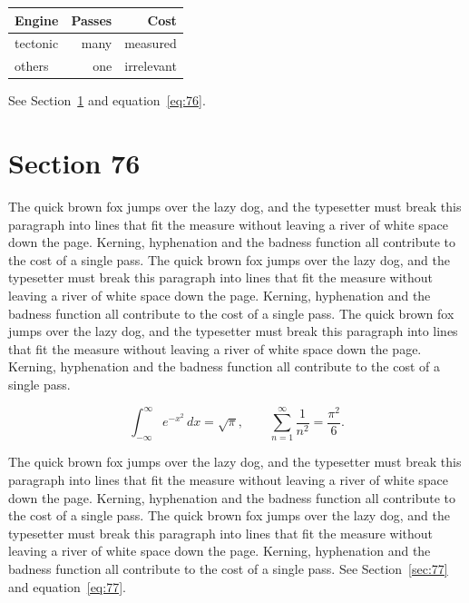 \documentclass{article}
\begin{document}
\begin{center}
\begin{tabular}{lrr}
\toprule
Engine & Passes & Cost \\
\midrule
tectonic & many & measured \\
others & one & irrelevant \\
\bottomrule
\end{tabular}
\end{center}

See Section~\ref{sec:76} and equation~\eqref{eq:76}.
\section{Section 76}
\label{sec:76}
The quick brown fox jumps over the lazy dog, and the typesetter must break this paragraph into lines that fit the measure without leaving a river of white space down the page. Kerning, hyphenation and the badness function all contribute to the cost of a single pass. The quick brown fox jumps over the lazy dog, and the typesetter must break this paragraph into lines that fit the measure without leaving a river of white space down the page. Kerning, hyphenation and the badness function all contribute to the cost of a single pass. The quick brown fox jumps over the lazy dog, and the typesetter must break this paragraph into lines that fit the measure without leaving a river of white space down the page. Kerning, hyphenation and the badness function all contribute to the cost of a single pass. 

\begin{equation}\label{eq:76}
\int_{-\infty}^{\infty} e^{-x^{2}}\,dx = \sqrt{\pi}, \qquad
\sum_{n=1}^{\infty} \frac{1}{n^{2}} = \frac{\pi^{2}}{6}.
\end{equation}

The quick brown fox jumps over the lazy dog, and the typesetter must break this paragraph into lines that fit the measure without leaving a river of white space down the page. Kerning, hyphenation and the badness function all contribute to the cost of a single pass. The quick brown fox jumps over the lazy dog, and the typesetter must break this paragraph into lines that fit the measure without leaving a river of white space down the page. Kerning, hyphenation and the badness function all contribute to the cost of a single pass. 
See Section~\ref{sec:77} and equation~\eqref{eq:77}.
\end{document}
